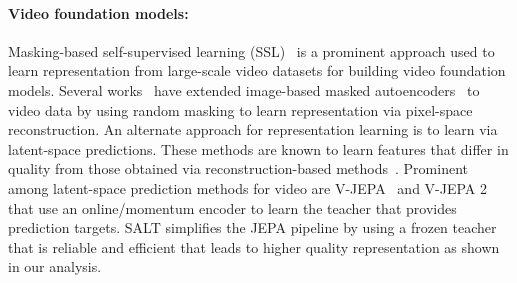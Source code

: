 \documentclass{applemlr}
\numberwithin{equation}{section}
\newcommand{\ourmethod}{SALT\xspace}
\begin{document}
\paragraph{Video foundation models:} Masking-based self-supervised learning (SSL)~\citep{videomaev1_tong2022, stmae_feichtenhofer2022, videomaev2_arxiv, bardes2024vjepa, assran2025vjepa2, mvd_wang2022, umt_li2023, videoprism_zhao2024, intervideo1_wang2022, dinov3} is a prominent approach used to learn representation from large-scale video datasets for building video foundation models. Several works~\citep{videomaev1_tong2022, stmae_feichtenhofer2022, videomaev2_wang2023_cvpr} have extended image-based masked autoencoders~\citep{mae} to video data by using random masking to learn representation via pixel-space reconstruction. An alternate approach for representation learning is to learn via latent-space predictions. These methods are known to learn features that differ in quality from those obtained via reconstruction-based methods~\citep{littwin_jepa_avoids_noisy_feats, balestriero_icml24b}. Prominent among latent-space prediction methods for video are V-JEPA~\citep{bardes2024vjepa} and V-JEPA 2~\citep{assran2025vjepa2} that use an online/momentum encoder to learn the teacher that provides prediction targets. \ourmethod simplifies the JEPA pipeline by using a frozen teacher that is reliable and efficient that leads to higher quality representation as shown in our analysis.
\end{document}
